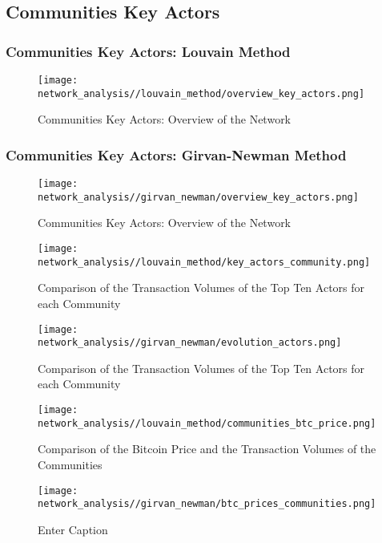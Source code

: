 \documentclass[a4paper, 12pt]{article}
\begin{document}
\subsection{Communities Key Actors}

\subsubsection{Communities Key Actors: Louvain Method}

\begin{figure}[h]
    \centering
    \texttt{[image: network\_analysis//louvain\_method/overview\_key\_actors.png]}
    \caption{Communities Key Actors: Overview of the Network}
    \label{fig:louvain_overview_key_actors}
\end{figure}

\subsubsection{Communities Key Actors: Girvan-Newman Method}

\begin{figure}[h]
    \centering
    \texttt{[image: network\_analysis//girvan\_newman/overview\_key\_actors.png]}
    \caption{Communities Key Actors: Overview of the Network}
    \label{fig:girvan_newman_top_ten_actors_vs_community}
\end{figure}

\newpage

\begin{figure}[h]
    \centering
    \texttt{[image: network\_analysis//louvain\_method/key\_actors\_community.png]}
    \caption{Comparison of the Transaction Volumes of the Top Ten Actors for each Community}
    \label{fig:louvain_top_ten_actors_vs_community}
\end{figure}

\begin{figure}[h]
    \centering
    \texttt{[image: network\_analysis//girvan\_newman/evolution\_actors.png]}
    \caption{Comparison of the Transaction Volumes of the Top Ten Actors for each Community}
    \label{fig:girvan_newman_top_ten_actors_vs_community}
\end{figure}

\newpage

\begin{figure}[h]
    \centering
    \texttt{[image: network\_analysis//louvain\_method/communities\_btc\_price.png]}
    \caption{Comparison of the Bitcoin Price and the Transaction Volumes of the Communities}
    \label{fig:louvain_communities_btc_price}
\end{figure}

\begin{figure}[h]
    \centering
    \texttt{[image: network\_analysis//girvan\_newman/btc\_prices\_communities.png]}
    \caption{Enter Caption}
    \label{fig:girvan_newman_btc_prices_communities}
\end{figure}
\end{document}
